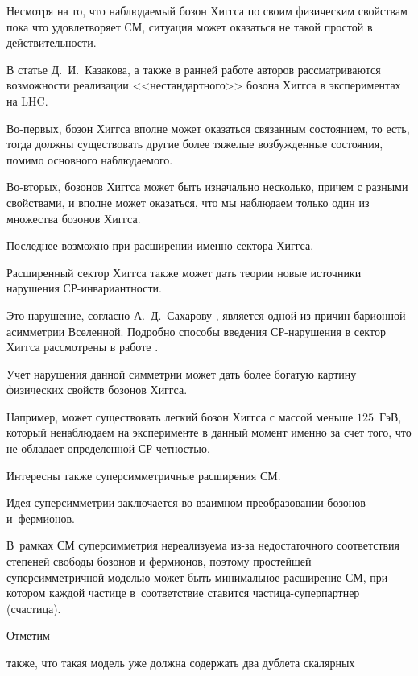 Несмотря на то, что наблюдаемый бозон Хиггса по своим физическим свойствам пока что удовлетворяет СМ, ситуация может оказаться не такой простой в действительности. 

В статье Д.~И.~Казакова\cite{gurskaya:bib:Kazakhov}, а также в ранней работе авторов \cite{gurskaya:bib:Gurskaya} рассматриваются возможности реализации <<нестандартного>>  бозона Хиггса в экспериментах на LHC. 

Во-первых, бозон Хиггса вполне может оказаться связанным состоянием, то есть, тогда должны существовать другие более тяжелые возбужденные состояния, помимо основного наблюдаемого. 

Во-вторых, бозонов Хиггса может быть изначально несколько, причем с разными свойствами, и вполне может оказаться, что мы наблюдаем только один из множества бозонов Хиггса. 

Последнее возможно при расширении именно сектора Хиггса.



Расширенный сектор Хиггса также может дать теории новые источники нарушения СР-инвариантности. 

Это нарушение, согласно А.~Д.~Сахарову \cite{gurskaya:bib:Sakharov}, является одной из причин барионной асимметрии Вселенной. Подробно способы введения СР-нарушения в сектор Хиггса рассмотрены в работе \cite{gurskaya:bib:Gurskaya2}.

Учет нарушения данной симметрии может дать более богатую картину физических свойств бозонов Хиггса. 

Например, может существовать легкий бозон Хиггса с массой меньше $125$~ГэВ, который ненаблюдаем на эксперименте в данный момент именно за счет того, что не обладает определенной СР-четностью.



Интересны также суперсимметричные расширения СМ. 

Идея суперсимметрии заключается во взаимном преобразовании бозонов и~фермионов. \linebreak

В~рамках СМ суперсимметрия нереализуема из-за недостаточного соответствия степеней свободы бозонов и фермионов, поэтому простейшей суперсимметричной моделью может быть минимальное расширение СМ, при котором каждой частице в~соответствие ставится частица-суперпартнер (счастица). 

Отметим

также, что такая модель уже должна содержать два дублета скалярных

